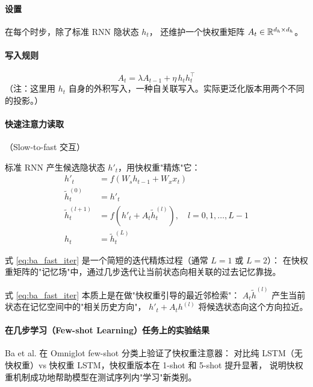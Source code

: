 \paragraph{设置}
在每个时步，除了标准 RNN 隐状态 $h_t$，
还维护一个快权重矩阵 $A_t \in \mathbb{R}^{d_h \times d_h}$。

\paragraph{写入规则}
\begin{equation}
  A_t = \lambda A_{t-1} + \eta\, h_t h_t^\top
  \label{eq:ba_write}
\end{equation}
（注：这里用 $h_t$ 自身的外积写入，一种自关联写入。实际更泛化版本用两个不同的投影。）

\paragraph{快速注意力读取}（Slow-to-fast 交互）

标准 RNN 产生候选隐状态 $h'_t$，用快权重"精炼"它：
\begin{align}
  h'_t &= f(W_s h_{t-1} + W_x x_t) \label{eq:ba_slow} \\
  \tilde{h}_t^{(0)} &= h'_t \\
  \tilde{h}_t^{(l+1)} &= f\left(h'_t + A_t \tilde{h}_t^{(l)}\right),\quad l = 0, 1, \ldots, L-1 \label{eq:ba_fast_iter} \\
  h_t &= \tilde{h}_t^{(L)}
\end{align}

式 \eqref{eq:ba_fast_iter} 是一个简短的迭代精炼过程（通常 $L=1$ 或 $L=2$）：
在快权重矩阵的"记忆场"中，通过几步迭代让当前状态向相关联的过去记忆靠拢。

\begin{remark}
式 \eqref{eq:ba_fast_iter} 本质上是在做"快权重引导的最近邻检索"：
$A_t \tilde{h}^{(l)}$ 产生当前状态在记忆空间中的"相关历史方向"，
$h'_t + A_t h^{(l)}$ 将候选状态向这个方向拉近。
\end{remark}

\paragraph{在几步学习（Few-shot Learning）任务上的实验结果}

Ba et al. 在 Omniglot few-shot 分类上验证了快权重注意器：
对比纯 LSTM（无快权重）vs 快权重 LSTM，快权重版本在 1-shot 和 5-shot 提升显著，
说明快权重机制成功地帮助模型在测试序列内"学习"新类别。

